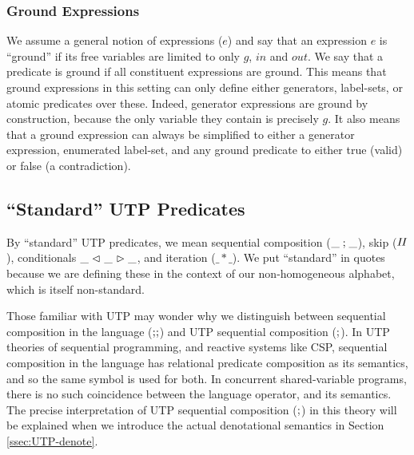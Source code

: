 \subsubsection{Ground Expressions}

We assume a general notion of expressions ($e$)
and say that an expression $e$ is ``ground''
if its free variables are limited to only $g$, $in$ and $out$.
We say that a predicate is ground if all constituent expressions
are ground.
This means that ground expressions in this setting can only
define either generators, label-sets, or atomic predicates
over these.
Indeed, generator expressions are ground by construction,
because the only variable they contain is precisely $g$.
It also means that a ground expression can always be simplified
to either a generator expression, enumerated label-set,
and any ground predicate to either true (valid) or false (a contradiction).



\subsection{``Standard'' UTP Predicates}

By ``standard'' UTP predicates,
we mean sequential composition ($\_\mathrel{;}\_$), skip ($\mathit{II}$),
conditionals $\_\mathrel{\lhd ~ {\_} ~ \rhd}\_$, and iteration ($\_*\_$).
We put ``standard'' in quotes because we are defining these
in the context of our non-homogeneous alphabet,
which is itself non-standard.

Those familiar with UTP may wonder why we distinguish between
sequential composition in the language ($\mathbin{;\!;}$)
and UTP sequential composition ($\mathrel{;}$).
In UTP theories of sequential programming,
and reactive systems like CSP, sequential composition
in the language has relational predicate composition
as its semantics,
and so the same symbol is used for both.
In concurrent shared-variable programs,
there is no such coincidence between the language operator,
and its semantics.
The precise interpretation of UTP sequential composition ($\mathrel{;}$)
in this theory will be explained when we introduce the
actual denotational semantics in Section \ref{ssec:UTP-denote}.


